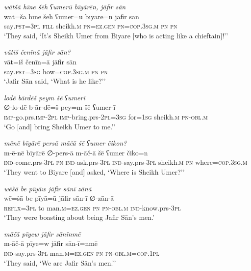 \ea \label{ŠJ.15}
\textit{wātšā hīne šēh ʕumerū bīyārēn, jāfir sān} \\ 
\gll wāt=šā hīne šēh ʕumer=ū bīyārē=n jāfir sān \\ 
 say\textsc{.pst}\textsc{=3pl} \textsc{fill} sheikh\textsc{.m} \textsc{pn}\textsc{=ez.gen} \textsc{pn}\textsc{=cop}\textsc{.3sg}\textsc{.m} \textsc{pn} \textsc{pn} \\ 
\glt `They said, ‘It’s Sheikh Umer from Biyare [who is acting like a chieftain]!’'
\z 
 
\ea \label{ŠJ.16}
\textit{vātiš čenīnā jāfir sān?} \\ 
\gll vāt=iš čenīn=ā jāfir sān \\ 
 say\textsc{.pst}\textsc{=3sg} how\textsc{=cop}\textsc{.3sg}\textsc{.m} \textsc{pn} \textsc{pn} \\ 
\glt `Jafir Sān said, ‘What is he like?’'
\z 
 
\ea \label{ŠJ.21}
\textit{lodē bārdēš peym šē ʕumerī} \\ 
\gll ∅-lo-dē b-ār-dē=š pey=m šē ʕumer-ī \\ 
 \textsc{imp-}go.prs.\textsc{imp-}\textsc{2pl} \textsc{imp-}bring.prs-\textsc{2pl}\textsc{=3sg} for\textsc{=\textsc{1sg}} sheikh\textsc{.m} \textsc{pn}\textsc{-obl}\textsc{.m} \\ 
\glt `Go [and] bring Sheikh Umer to me.’'
\z 
 
\ea \label{ŠJ.22}
\textit{mēnē bīyārē persā māčā šē ʕumer čikon?} \\ 
\gll m-ē-nē bīyārē ∅-pers-ā m-āč-ā šē ʕumer čiko=n \\ 
 \textsc{ind-}come.prs\textsc{-3pl} \textsc{pn} \textsc{ind-}ask.prs\textsc{-3pl} \textsc{ind-}say.prs\textsc{-3pl} sheikh\textsc{.m} \textsc{pn} where\textsc{=cop}\textsc{.3sg}\textsc{.m} \\ 
\glt `They went to Biyare [and] asked, ‘Where is Sheikh Umer?’'
\z 
 
\ea \label{ŠJ.29}
\textit{wēšā be pīyāw jāfir sānī zānā} \\ 
\gll wē=šā be pīyā=ū jāfir sān-ī ∅-zān-ā \\ 
 \textsc{reflx}\textsc{=3pl} to man\textsc{.m}\textsc{=ez.gen} \textsc{pn} \textsc{pn}\textsc{-obl}\textsc{.m} \textsc{ind-}know.prs\textsc{-3pl} \\ 
\glt `They were boasting about being Jafir Sān’s men.'
\z 
 
\ea \label{ŠJ.34}
\textit{māčā pīyew jāfir sānīnmē} \\ 
\gll m-āč-ā pīye=w jāfir sān-ī=nmē \\ 
 \textsc{ind-}say.prs\textsc{-3pl} man\textsc{.m}\textsc{=ez.gen} \textsc{pn} \textsc{pn}\textsc{-obl}\textsc{.m}\textsc{=cop}\textsc{.\textsc{1pl}} \\ 
\glt `They said, ‘We are Jafir Sān’s men.’'
\z 
 
